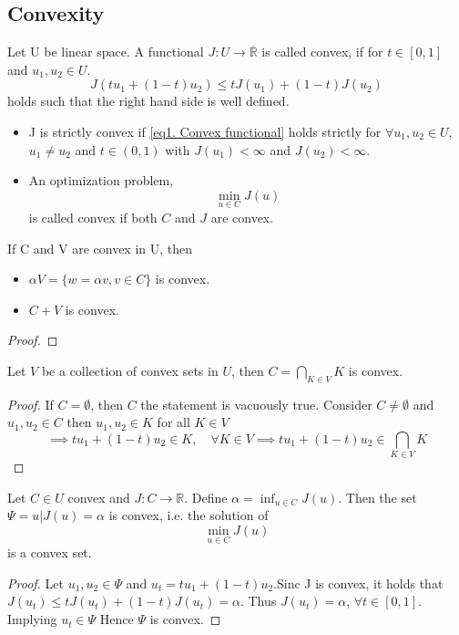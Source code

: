 \subsection{Convexity}
\begin{definition}
	Let U be linear space. A functional $J:U\rightarrow \overline{\mathbb{R}}$ is called convex, if for $t\in[0,1]$ and $u_1, u_2 \in U$.
	\begin{equation}
		J(tu_1+(1-t)u_2)\leq t J(u_1)+(1-t)J(u_2) \label{eq1. Convex functional}
	\end{equation}
	holds such that the right hand side is well defined.
	\begin{itemize}
	\item 	J is strictly convex if \eqref{eq1. Convex functional} holds strictly for $\forall u_1, u_2 \in U$, $u_1\neq u_2$ and $t \in (0,1)$ with $J(u_1)<\infty$ and $J(u_2)< \infty$.
	\item An optimization problem, 
	\[
		\min_{u \in C} J(u)
	\] is called convex if both $C$ and $J$ are convex.
	\end{itemize}
\end{definition}

\begin{lemma}
	If C and V are convex in U, then
	\begin{itemize}
		\item  $\alpha V = \lbrace w = \alpha v, v\in C \rbrace$ is convex.
		\item $C+V$ is convex.
	\end{itemize}
	\begin{proof}
		
	\end{proof}
\end{lemma}


\begin{lemma}
	Let $V$ be a collection of convex sets in $U$, then $C=\bigcap_{K \in V} K$ is convex.
	\begin{proof}
			If $C = \emptyset$, then $C$ the statement is vacuously true. Consider $C\neq \emptyset$ and $u_1, u_2 \in C$ then $u_1, u_2 \in K$ for all $K \in V$
			\[
			\implies tu_1+(1-t)u_2 \in K, \quad \forall K \in V \implies tu_1+(1-t)u_2 \in \bigcap_{K \in V} K 
			\]
	\end{proof}
\end{lemma}

\begin{lemma}
		Let $C\in U$ convex and $J: C \rightarrow \mathbb{R}$. Define $\alpha=\inf_{u\in C} J(u)$. Then the set $\Psi = {u | J(u)=\alpha}$ is convex, i.e. the solution of 
		\[
			\min_{u \in C} J(u)
		\] 
		is a convex set.
		\begin{proof}
			Let $u_1, u_2 \in \Psi$ and $u_t=tu_1+(1-t)u_2$.Sinc J is convex, it holds that
			$J(u_t)\leq t J(u_t)+(1-t)J(u_t)=\alpha$. Thus $J(u_t)=\alpha$, $\forall t \in [0,1]$. Implying $u_t \in \Psi$ Hence $\Psi$ is convex.
		\end{proof}
\end{lemma}

